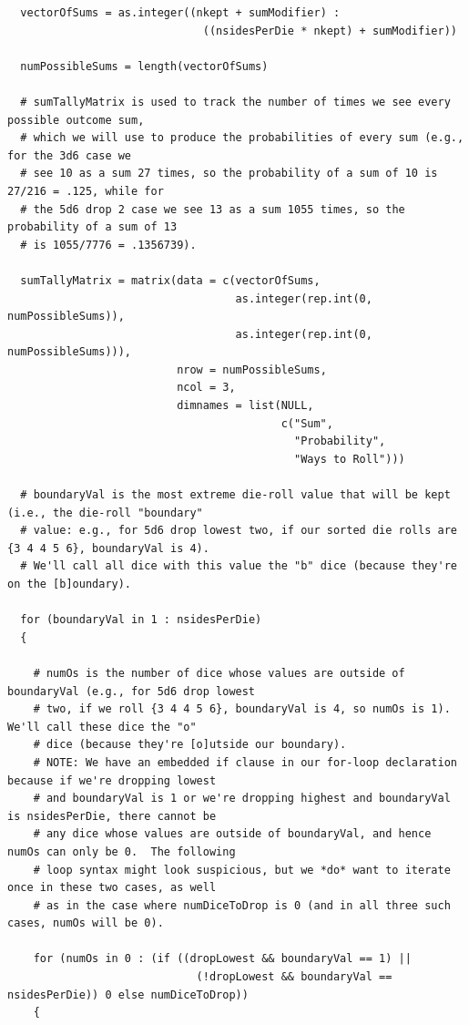 \documentclass[12pt]{article}
\begin{document}
\begin{lstlisting}
  vectorOfSums = as.integer((nkept + sumModifier) :
                              ((nsidesPerDie * nkept) + sumModifier))
  
  numPossibleSums = length(vectorOfSums)
  
  # sumTallyMatrix is used to track the number of times we see every possible outcome sum,
  # which we will use to produce the probabilities of every sum (e.g., for the 3d6 case we 
  # see 10 as a sum 27 times, so the probability of a sum of 10 is 27/216 = .125, while for
  # the 5d6 drop 2 case we see 13 as a sum 1055 times, so the probability of a sum of 13
  # is 1055/7776 = .1356739).
  
  sumTallyMatrix = matrix(data = c(vectorOfSums,
                                   as.integer(rep.int(0, numPossibleSums)),
                                   as.integer(rep.int(0, numPossibleSums))),
                          nrow = numPossibleSums,
                          ncol = 3,
                          dimnames = list(NULL,
                                          c("Sum",
                                            "Probability",
                                            "Ways to Roll")))
  
  # boundaryVal is the most extreme die-roll value that will be kept (i.e., the die-roll "boundary"
  # value: e.g., for 5d6 drop lowest two, if our sorted die rolls are {3 4 4 5 6}, boundaryVal is 4).
  # We'll call all dice with this value the "b" dice (because they're on the [b]oundary).
  
  for (boundaryVal in 1 : nsidesPerDie)
  {
    
    # numOs is the number of dice whose values are outside of boundaryVal (e.g., for 5d6 drop lowest 
    # two, if we roll {3 4 4 5 6}, boundaryVal is 4, so numOs is 1).  We'll call these dice the "o"
    # dice (because they're [o]utside our boundary).  
    # NOTE: We have an embedded if clause in our for-loop declaration because if we're dropping lowest 
    # and boundaryVal is 1 or we're dropping highest and boundaryVal is nsidesPerDie, there cannot be 
    # any dice whose values are outside of boundaryVal, and hence numOs can only be 0.  The following 
    # loop syntax might look suspicious, but we *do* want to iterate once in these two cases, as well
    # as in the case where numDiceToDrop is 0 (and in all three such cases, numOs will be 0).
    
    for (numOs in 0 : (if ((dropLowest && boundaryVal == 1) ||
                             (!dropLowest && boundaryVal == nsidesPerDie)) 0 else numDiceToDrop))
    {
      

\end{lstlisting}
\end{document}
